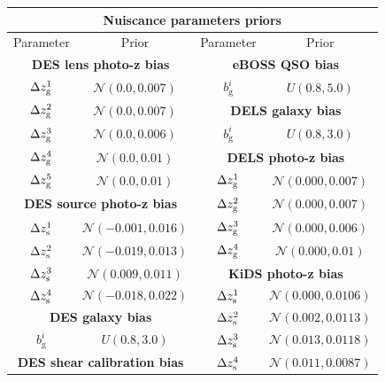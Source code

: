 \documentclass[a4paper,11pt]{article}
\newcommand{\cN}{\mathcal{N}}
\newcommand{\dls}{DELS\xspace}
\begin{document}
      \begin{table}
        \centering
        \def\arraystretch{1.2}
        \begin{tabular}{|cc|cc|}
        \hline
        \multicolumn{4}{|c|}{\textbf{Nuiscance parameters priors}} \\
        \hline
        Parameter &  Prior & Parameter &  Prior\\  
        \hline 
        \multicolumn{2}{|c|}{\textbf{DES lens photo-z bias}}  &        \multicolumn{2}{c|}{\textbf{eBOSS QSO bias}} \\
        $\Delta z_{{\rm g}}^1 $ & $\cN (0.0, 0.007)$ &             $b_\mathrm{g}^{i}$   & $U (0.8, 5.0)$ \\ \cline{3-4}
        $\Delta z_{{\rm g}}^2 $  & $\cN (0.0, 0.007)$ &            \multicolumn{2}{c|}{\textbf{\dls galaxy bias}} \\
        $\Delta z_{{\rm g}}^3 $  & $\cN (0.0, 0.006)$ &            $b_\mathrm{g}^{i}$   & $U (0.8, 3.0)$ \\
        $\Delta z_{{\rm g}}^4 $  & $\cN (0.0, 0.01)$ &             \multicolumn{2}{c|}{\textbf{\dls photo-z bias}} \\
        $\Delta z_{{\rm g}}^5 $  & $\cN (0.0, 0.01)$  &            $\Delta z_{{\rm g}}^1 $  & $\cN (0.000, 0.007)$ \\
        \multicolumn{2}{|c|}{\textbf{DES source photo-z bias}} &        $\Delta z_{{\rm g}}^2 $  & $\cN (0.000, 0.007)$ \\
        $\Delta z_{{\rm s}}^1 $  & $\cN (-0.001,0.016)$ &          $\Delta z_{{\rm g}}^3 $  & $\cN (0.000, 0.006)$ \\
        $\Delta z_{{\rm s}}^2 $  & $\cN (-0.019,0.013)$ &          $\Delta z_{{\rm g}}^4 $  & $\cN (0.000, 0.01)$ \\\cline{3-4} 
        $\Delta z_{{\rm s}}^3 $  & $\cN (0.009, 0.011)$ &          \multicolumn{2}{c|}{\textbf{KiDS photo-z bias}} \\
        $\Delta z_{{\rm s}}^4 $  & $\cN (-0.018, 0.022)$ &         $\Delta z_{{\rm s}}^1 $  & $\cN (0.000, 0.0106)$ \\ 
        \multicolumn{2}{|c|}{\textbf{DES galaxy bias}}            &    $\Delta z_{{\rm s}}^2 $  & $\cN (0.002, 0.0113)$ \\
        $b_\mathrm{g}^{i}$   & $U (0.8, 3.0)$                 &    $\Delta z_{{\rm s}}^3 $  & $\cN (0.013, 0.0118)$ \\
        \multicolumn{2}{|c|}{\textbf{DES shear calibration bias }}&    $\Delta z_{{\rm s}}^4 $  & $\cN (0.011, 0.0087)$ \\ 

\end{tabular}
\end{table}
\end{document}

